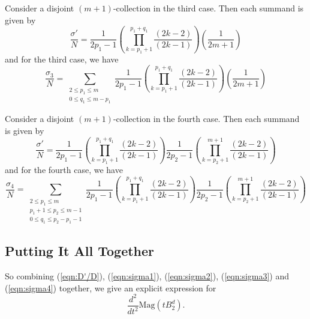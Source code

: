 \documentclass[11pt]{article}
\theoremstyle{mythm}
\begin{document}
Consider a disjoint $(m+1)$-collection in the third case. Then each summand is given by
\begin{equation*}
\frac{\sigma'}{N} = \frac{1}{2p_1-1}\left(\prod\limits_{k=p_1+1}^{p_1+q_1}\frac{(2k-2)}{(2k-1)}\right)\left(\frac{1}{2m+1}\right)
\end{equation*}
and for the third case, we have
\begin{equation}\label{eqn:sigma3}
\frac{\sigma_3}{N} = \sum\limits_{\substack{2\leq p_1\leq m \\ 0\leq q_1\leq m-p_1}}\frac{1}{2p_1-1}\left(\prod\limits_{k=p_1+1}^{p_1+q_1}\frac{(2k-2)}{(2k-1)}\right)\left(\frac{1}{2m+1}\right)
\end{equation}

Consider a disjoint $(m+1)$-collection in the fourth case. Then each summand is given by
\begin{equation*}
\frac{\sigma'}{N} = \frac{1}{2p_1-1}\left(\prod\limits_{k=p_1+1}^{p_1+q_1}\frac{(2k-2)}{(2k-1)}\right)\frac{1}{2p_2-1}\left(\prod\limits_{k=p_2+1}^{m+1}\frac{(2k-2)}{(2k-1)}\right)
\end{equation*}
and for the fourth case, we have
\begin{equation}\label{eqn:sigma4}
\frac{\sigma_4}{N} = \sum\limits_{\substack{2\leq p_1\leq m \\ p_1+1\leq p_2 \leq m-1 \\ 0\leq q_1\leq p_2-p_1-1 }}\frac{1}{2p_1-1}\left(\prod\limits_{k=p_1+1}^{p_1+q_1}\frac{(2k-2)}{(2k-1)}\right)\frac{1}{2p_2-1}\left(\prod\limits_{k=p_2+1}^{m+1}\frac{(2k-2)}{(2k-1)}\right)
\end{equation}

\subsection{Putting It All Together}

So combining (\ref{eqn:D'/D}), (\ref{eqn:sigma1}), (\ref{eqn:sigma2}), (\ref{eqn:sigma3}) and (\ref{eqn:sigma4}) together, we give an explicit expression for
\begin{equation*}
\frac{d^2}{dt^2}\text{Mag}\left(tB_2^d\right).
\end{equation*}
\end{document}
